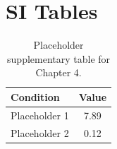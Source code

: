 \section{SI Tables}

\begin{table}[htbp]
  \centering
  \caption{Placeholder supplementary table for Chapter 4.}
  \label{tab:ch4-si-table1}
  \begin{tabular}{lc}
    \toprule
    Condition & Value \\
    \midrule
    Placeholder 1 & 7.89 \\
    Placeholder 2 & 0.12 \\
    \bottomrule
  \end{tabular}
\end{table}
